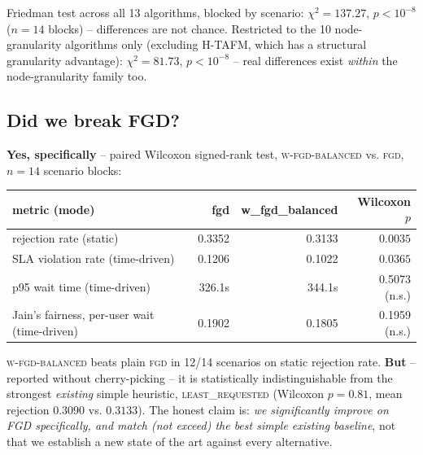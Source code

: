 \documentclass[11pt]{article}
\begin{document}
Friedman test across all 13 algorithms, blocked by scenario:
$\chi^2=137.27$, $p<10^{-8}$ ($n=14$ blocks) -- differences are not chance.
Restricted to the 10 node-granularity algorithms only (excluding H-TAFM,
which has a structural granularity advantage): $\chi^2=81.73$,
$p<10^{-8}$ -- real differences exist \emph{within} the node-granularity
family too.

\subsection{Did we break FGD?}
\label{sec:did-we-break-fgd}
\textbf{Yes, specifically} -- paired Wilcoxon signed-rank test,
\textsc{w-fgd-balanced} vs. \textsc{fgd}, $n=14$ scenario blocks:
\begin{center}
\begin{tabular}{lrrr}
\toprule
metric (mode) & fgd & w\_fgd\_balanced & Wilcoxon $p$ \\
\midrule
rejection rate (static) & 0.3352 & 0.3133 & $\mathbf{0.0035}$ \\
SLA violation rate (time-driven) & 0.1206 & 0.1022 & $\mathbf{0.0365}$ \\
p95 wait time (time-driven) & 326.1s & 344.1s & 0.5073 (n.s.) \\
Jain's fairness, per-user wait (time-driven) & 0.1902 & 0.1805 & 0.1959 (n.s.) \\
\bottomrule
\end{tabular}
\end{center}
\textsc{w-fgd-balanced} beats plain \textsc{fgd} in 12/14 scenarios on
static rejection rate. \textbf{But} -- reported without cherry-picking --
it is statistically indistinguishable from the strongest \emph{existing}
simple heuristic, \textsc{least\_requested} (Wilcoxon $p=0.81$, mean
rejection $0.3090$ vs. $0.3133$). The honest claim is: \emph{we
significantly improve on FGD specifically, and match (not exceed) the best
simple existing baseline}, not that we establish a new state of the art
against every alternative.
\end{document}
